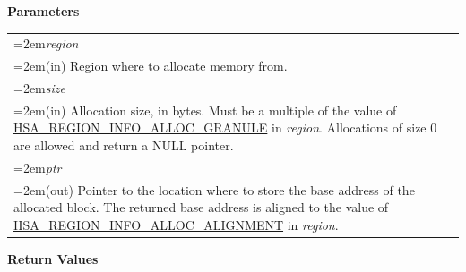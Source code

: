 \documentclass[final]{book}
\newcommand{\hsaarg}[1]{\textit{#1}}
\begin{document}
\noindent\textbf{Parameters}\\[-6mm]
\noindent\begin{longtable}{@{}>{\hangindent=2em}p{\textwidth}}
\hsaarg{region}\\\hspace{2em}(in) Region where to allocate memory from.\\[2mm]
\hsaarg{size}\\\hspace{2em}(in) Allocation size, in bytes. Must be a multiple of the value of \hyperlink{group__memory_1ggad35755078ff15f645c6c25e7f7ef2707ab602c01f90962314de88fb887b6f13b3}{HSA_\-REGION_\-INFO_\-ALLOC_\-GRANULE} in \textit{region}. Allocations of size 0 are allowed and return a NULL pointer.\\[2mm]
\hsaarg{ptr}\\\hspace{2em}(out) Pointer to the location where to store the base address of the allocated block. The returned base address is aligned to the value of \hyperlink{group__memory_1ggad35755078ff15f645c6c25e7f7ef2707af3103bc1328080b236a7847f1bf4998e}{HSA_\-REGION_\-INFO_\-ALLOC_\-ALIGNMENT} in \textit{region}.
\end{longtable}
\vspace{-5mm}\noindent\textbf{Return Values}\\[-6mm]
\end{document}
